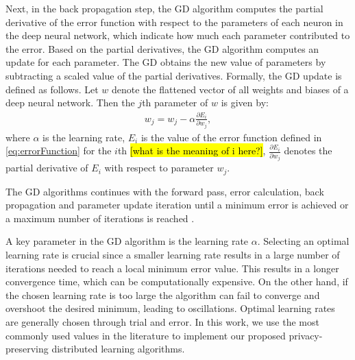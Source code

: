 \documentclass[conference]{IEEEtran}
\begin{document}
Next, in the back propagation step, the GD algorithm 
computes the partial derivative of the error function with respect to the
parameters of each neuron in the deep neural network, which indicate how much each parameter contributed to
the error. Based on the partial derivatives, the GD algorithm computes an update for each parameter. 
The GD  obtains the new value of parameters by subtracting a scaled value of the partial derivatives. Formally, the GD update is
defined as follows.  Let $w$ denote the flattened vector of all weights and biases of a deep neural
network. Then the $j$th parameter of $w$ is given by:
\begin{align}\label{eq:GD}
w_j = w_j -\alpha \frac{\partial E_i}{\partial w_j}, 
\end{align}
where $\alpha$ is the learning rate,  $E_i$ is the value of the error function defined in \eqref{eq:errorFunction} for the $i$th \hl{
[what is the meaning of i here?]}, $\frac{\partial E_i}{\partial w_j}$ denotes the partial derivative of $E_i$ with respect to
parameter $w_j$.

The GD algorithms continues with the forward pass, error calculation, back propagation and parameter update iteration until a minimum
error is achieved or a maximum number of iterations is reached \cite{ruder2016overview}. 

A key parameter in the GD algorithm is the learning rate $\alpha$.   Selecting an optimal learning
rate is crucial since a smaller learning rate results in a large number of iterations needed to reach a local minimum error value. This
results in a longer convergence time, which can be computationally expensive. On the other hand, if the chosen learning rate is too
large the algorithm can fail to converge and overshoot the desired minimum, leading to oscillations.  Optimal learning rates are
generally chosen through trial and error. In this work, we use the most commonly used values in the literature to implement our
proposed privacy-preserving distributed learning algorithms. 
\end{document}

